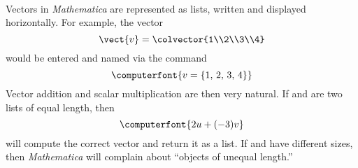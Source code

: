 \contributedby{\robertbeezer}\\
Vectors in {\sl Mathematica} are represented as lists, written and displayed horizontally.  For example, the vector
%
\begin{equation*}
\vect{v}=\colvector{1\\2\\3\\4}
\end{equation*}
%
would be entered and named via the command
%
\begin{equation*}
\computerfont{v=\{1,\,2,\,3,\,4\}}
\end{equation*}
%
Vector addition and scalar multiplication are then very natural.  If  and  are two lists of equal length, then
%
\begin{equation*}
\computerfont{2 u + (-3) v}
\end{equation*}
%
will compute the correct vector and return it as a list.  If  and  have different sizes, then {\sl Mathematica} will complain about ``objects of unequal length.''
